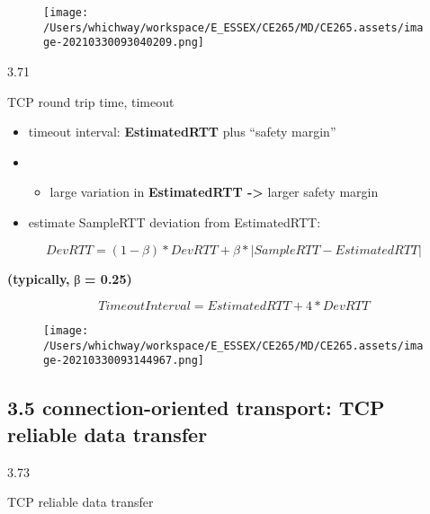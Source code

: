 \documentclass[
]{article}
\begin{document}
\begin{figure}
\centering
\texttt{[image: /Users/whichway/workspace/E\_ESSEX/CE265/MD/CE265.assets/image-20210330093040209.png]}
\caption{}
\end{figure}

3.71

TCP round trip time, timeout

\begin{itemize}
\item
  timeout interval: \textbf{EstimatedRTT} plus ``safety margin''
\item
  \begin{itemize}
  \item
    large variation in \textbf{EstimatedRTT -\textgreater{}} larger
    safety margin
  \end{itemize}
\item
  estimate SampleRTT deviation from EstimatedRTT:
\end{itemize}

\[DevRTT = (1-β)*DevRTT +
             β*|SampleRTT-EstimatedRTT|\]

\textbf{(typically,} β \textbf{= 0.25)}

\[TimeoutInterval = EstimatedRTT + 4*DevRTT\]

\begin{figure}
\centering
\texttt{[image: /Users/whichway/workspace/E\_ESSEX/CE265/MD/CE265.assets/image-20210330093144967.png]}
\caption{}
\end{figure}

\hypertarget{35-connection-oriented-transport-tcp-reliable-data-transfer}{%
\subsection{3.5 connection-oriented transport: TCP reliable data
transfer}\label{35-connection-oriented-transport-tcp-reliable-data-transfer}}

3.73

TCP reliable data transfer
\end{document}
